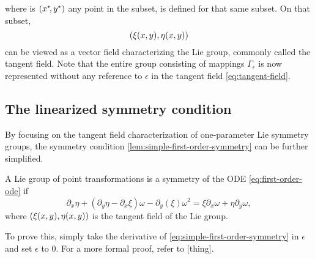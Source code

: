 where is \(\pqty{x^*\!,y^*}\) any point in the subset, is defined for that same subset. %
On that subset,
\begin{equation} \label{eq:tangent-field}
  \pqty{\xi(x,y), \eta(x,y)}
\end{equation}
can be viewed as a vector field characterizing the Lie group, commonly called the tangent field.
Note that the entire group consisting of mappings \(\Gamma_\epsilon\) is now represented without any reference to \(\epsilon\) in the tangent field \ref{eq:tangent-field}.

\subsection{The linearized symmetry condition}

By focusing on the tangent field characterization of one-parameter Lie symmetry groups, the symmetry condition \ref{lem:simple-first-order-symmetry} can be further simplified.
\begin{lem} \label{lem:linearized-first-order-symmetry}
  A Lie group of point transformations is a symmetry of the ODE \ref{eq:first-order-ode} if
  \begin{equation}
    \partial_x \eta + (\partial_y \eta - \partial_x \xi) \omega - \partial_y (\xi) \omega^2 =
    \xi \partial_x \omega + \eta \partial_y \omega,
  \end{equation}
  where \(\pqty{\xi(x,y), \eta(x,y)}\) is the tangent field of the Lie group.
\end{lem} %
To prove this, simply take the derivative of \cref{eq:simple-first-order-symmetry} in \(\epsilon\) and set \(\epsilon\) to 0.
For a more formal proof, refer to [thing]. %


